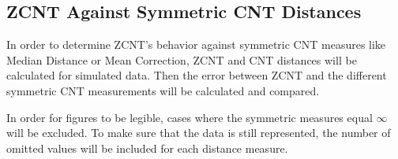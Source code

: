\subsection{ZCNT Against Symmetric CNT Distances}\label{section:symmetric_cnt_vs_zcnt}
In order to determine ZCNT's behavior against symmetric CNT measures like Median Distance or Mean Correction, ZCNT and CNT distances will be calculated for simulated data. Then the error between ZCNT and the different symmetric CNT measurements will be calculated and compared. 

In order for figures to be legible, cases where the symmetric measures equal $\infty$ will be excluded. To make sure that the data is still represented, the number of omitted values will be included for each distance measure.
